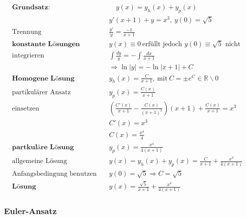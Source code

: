 \begin{equation*}
\begin{split}
\textbf{Grundsatz:} &\quad y(x) = y_h(x) + y_p(x) \\
& y'(x+1) + y = x^3,\ y(0) = \sqrt{5} \\
\text{Trennung}\quad & \frac{y'}{y} = \frac{-1}{x+1} \\
\textbf{konstante L{\"o}sungen}\quad & y(x) \equiv 0\ \text{erf{\"u}llt jedoch $y(0) \equiv \sqrt{5}$ nicht} \\
\text{integrieren}\quad & \int \frac{dy}{y} = - \int \frac{dx}{x+1} \\
& \Rightarrow \ln|y| = -\ln|x+1| + C \\
\textbf{Homogene L{\"o}sung} \quad & y_h(x) = \frac{C}{x+1},\ \text{mit}\ C= \pm e^C \in \mathbb{R}\backslash{0} \\
\text{partikul{\"a}rer Ansatz}\quad & y_p(x) = \frac{C(x)}{x+1} \\
\text{einsetzen} \quad & (\frac{C'(x)}{x+1} - \frac{C(x)}{(x+1)^2})(x+1) + \frac{C(x)}{x+1} = x^3 \\
& C'(x) = x^3 \\
& C(x) = \frac{x^4}{4} \\
\textbf{partkul{\"a}re L{\"o}sung} \quad & y_p(x) = \frac{x^4}{4(x+1)} \\
\text{allgemeine L{\"o}sung}\quad & y(x) = y_h(x) + y_p(x) = \frac{C}{x+1} + \frac{x^4}{4(x+1)} \\
\text{Anfangsbedingung benutzen} \quad & y(0) = \sqrt{5} \Rightarrow C = \sqrt{5} \\
\textbf{L{\"o}sung} \quad & y(x) = \frac{\sqrt{5}}{x+1} + \frac{x^4}{4(x+1)}
\end{split}
\end{equation*}

%



\subsubsection{Euler-Ansatz}

